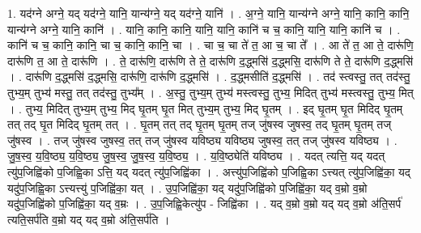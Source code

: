 \documentclass[17pt]{extarticle}
\begin{document}
1. यद॑ग्ने अग्ने॒ यद् यद॑ग्ने॒ यानि॒ यान्य॑ग्ने॒ यद् यद॑ग्ने॒ यानि॑ । . अ॒ग्ने॒ यानि॒ यान्य॑ग्ने अग्ने॒ यानि॒ कानि॒ कानि॒ यान्य॑ग्ने अग्ने॒ यानि॒ कानि॑ । . यानि॒ कानि॒ कानि॒ यानि॒ यानि॒ कानि॑ च च॒ कानि॒ यानि॒ यानि॒ कानि॑ च । . कानि॑ च च॒ कानि॒ कानि॒ चा च॒ कानि॒ कानि॒ चा । . चा च॒ चा ते॑ त॒ आ च॒ चा ते᳚ । . आ ते॑ त॒ आ ते॒ दारू॑णि॒ दारू॑णि त॒ आ ते॒ दारू॑णि । . ते॒ दारू॑णि॒ दारू॑णि ते ते॒ दारू॑णि द॒द्ध्मसि॑ द॒द्ध्मसि॒ दारू॑णि ते ते॒ दारू॑णि द॒द्ध्मसि॑ । . दारू॑णि द॒द्ध्मसि॑ द॒द्ध्मसि॒ दारू॑णि॒ दारू॑णि द॒द्ध्मसि॑ । . द॒द्ध्मसीति॑ द॒द्ध्मसि॑ । . तद॑ स्त्वस्तु॒ तत् तद॑स्तु॒ तुभ्य॒म् तुभ्य॑ मस्तु॒ तत् तद॑स्तु॒ तुभ्य᳚म् । . अ॒स्तु॒ तुभ्य॒म् तुभ्य॑ मस्त्वस्तु॒ तुभ्य॒ मिदित् तुभ्य॑ मस्त्वस्तु॒ तुभ्य॒ मित् । . तुभ्य॒ मिदित् तुभ्य॒म् तुभ्य॒ मिद् घृ॒तम् घृ॒त मित् तुभ्य॒म् तुभ्य॒ मिद् घृ॒तम् । . इद् घृ॒तम् घृ॒त मिदिद् घृ॒तम् तत् तद् घृ॒त मिदिद् घृ॒तम् तत् । . घृ॒तम् तत् तद् घृ॒तम् घृ॒तम् तज् जु॑षस्व जुषस्व॒ तद् घृ॒तम् घृ॒तम् तज् जु॑षस्व । . तज् जु॑षस्व जुषस्व॒ तत् तज् जु॑षस्व यविष्ठ्य यविष्ठ्य जुषस्व॒ तत् तज् जु॑षस्व यविष्ठ्य । . जु॒ष॒स्व॒ य॒वि॒ष्ठ्य॒ य॒वि॒ष्ठ्य॒ जु॒ष॒स्व॒ जु॒ष॒स्व॒ य॒वि॒ष्ठ्य॒ । . य॒वि॒ष्ठ्येति॑ यविष्ठ्य । . यदत् त्यत्ति॒ यद् यदत् त्यु॑प॒जिह्वि॑को प॒जिह्वि॒का ऽत्ति॒ यद् यदत् त्यु॑प॒जिह्वि॑का । . अत्त्यु॑प॒जिह्वि॑को प॒जिह्वि॒का ऽत्त्यत् त्यु॑प॒जिह्वि॑का॒ यद् यदु॑प॒जिह्वि॒का ऽत्त्यत्त्यु॑ प॒जिह्वि॑का॒ यत् । . उ॒प॒जिह्वि॑का॒ यद् यदु॑प॒जिह्वि॑को प॒जिह्वि॑का॒ यद् व॒म्रो व॒म्रो यदु॑प॒जिह्वि॑को प॒जिह्वि॑का॒ यद् व॒म्रः । . उ॒प॒जिह्वि॒केत्यु॑प - जिह्वि॑का । . यद् व॒म्रो व॒म्रो यद् यद् व॒म्रो अ॑ति॒सर्प॑ त्यति॒सर्प॑ति व॒म्रो यद् यद् व॒म्रो अ॑ति॒सर्प॑ति । \newline
\end{document}
